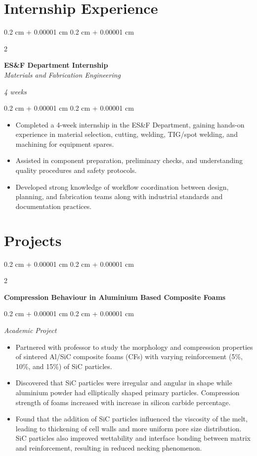 \documentclass[10pt, letterpaper]{article}
\newenvironment{highlights}{
    \begin{itemize}[
        topsep=0.10 cm,
        parsep=0.10 cm,
        partopsep=0pt,
        itemsep=0pt,
        leftmargin=0.4 cm + 10pt
    ]
}{
    \end{itemize}
} %
\newenvironment{onecolentry}{
    \begin{adjustwidth}{
        0.2 cm + 0.00001 cm
    }{
        0.2 cm + 0.00001 cm
    }
}{
    \end{adjustwidth}
} %
\newenvironment{twocolentry}[2][]{
    \onecolentry
    \def\secondColumn{#2}
    \setcolumnwidth{\fill, 4.5 cm}
    \begin{paracol}{2}
}{
    \switchcolumn \raggedleft \secondColumn
    \end{paracol}
    \endonecolentry
} %
\begin{document}
    \section{Internship Experience}
    \begin{twocolentry}{
        \textit{4 weeks}
    }
        \textbf{ES\&F Department Internship} \\
        \textit{Materials and Fabrication Engineering}
    \end{twocolentry}
    \vspace{0.10 cm}
    \begin{onecolentry}
        \begin{highlights}
            \item Completed a 4-week internship in the ES\&F Department, gaining hands-on experience in material selection, cutting, welding, TIG/spot welding, and machining for equipment spares.
            \item Assisted in component preparation, preliminary checks, and understanding quality procedures and safety protocols.
            \item Developed strong knowledge of workflow coordination between design, planning, and fabrication teams along with industrial standards and documentation practices.
        \end{highlights}
    \end{onecolentry}

    \section{Projects}
    \begin{twocolentry}{}
        \textbf{Compression Behaviour in Aluminium Based Composite Foams}
    \end{twocolentry}
    \vspace{0.10 cm}
    \begin{onecolentry}
        \textit{Academic Project}
        \begin{highlights}
            \item Partnered with professor to study the morphology and compression properties of sintered Al/SiC composite foams (CFs) with varying reinforcement (5\%, 10\%, and 15\%) of SiC particles.
            \item Discovered that SiC particles were irregular and angular in shape while aluminium powder had elliptically shaped primary particles. Compression strength of foams increased with increase in silicon carbide percentage.
            \item Found that the addition of SiC particles influenced the viscosity of the melt, leading to thickening of cell walls and more uniform pore size distribution. SiC particles also improved wettability and interface bonding between matrix and reinforcement, resulting in reduced necking phenomenon.
        \end{highlights}
    \end{onecolentry}
\end{document}
